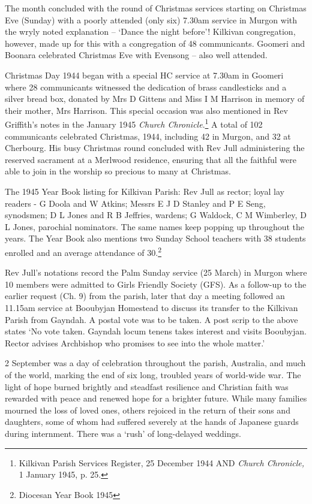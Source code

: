 The month concluded with the round of Christmas services starting on
Christmas Eve (Sunday) with a poorly attended (only six) 7.30am service
in Murgon with the wryly noted explanation -- `Dance the night before'!
Kilkivan congregation, however, made up for this with a congregation of
48 communicants. Goomeri and Boonara celebrated Christmas Eve with
Evensong -- also well attended.

Christmas Day 1944 began with a special HC service at 7.30am in Goomeri
where 28 communicants witnessed the dedication of brass candlesticks and
a silver bread box, donated by Mrs D Gittens and Miss I M Harrison in
memory of their mother, Mrs Harrison. This special occasion was also
mentioned in Rev Griffith's notes in the January 1945 \emph{Church
Chronicle}.\footnote{Kilkivan Parish Services Register, 25 December 1944
  AND \emph{Church Chronicle,} 1 January 1945, p. 25.} A total of 102
communicants celebrated Christmas, 1944, including 42 in Murgon, and 32
at Cherbourg. His busy Christmas round concluded with Rev Jull
administering the reserved sacrament at a Merlwood residence, ensuring
that all the faithful were able to join in the worship so precious to
many at Christmas.

The 1945 Year Book listing for Kilkivan Parish: Rev Jull as rector;
loyal lay readers - G Doola and W Atkins; Messrs E J D Stanley and P E
Seng, synodsmen; D L Jones and R B Jeffries, wardens; G Waldock, C M
Wimberley, D L Jones, parochial nominators. The same names keep popping
up throughout the years. The Year Book also mentions two Sunday School
teachers with 38 students enrolled and an average attendance of
30.\footnote{Diocesan Year Book 1945}

Rev Jull's notations record the Palm Sunday service (25 March) in Murgon
where 10 members were admitted to Girls Friendly Society (GFS). As a
follow-up to the earlier request (Ch. 9) from the parish, later that day
a meeting followed an 11.15am service at Booubyjan Homestead to discuss
its transfer to the Kilkivan Parish from Gayndah. A postal vote was to
be taken. A post scrip to the above states `No vote taken. Gayndah locum
tenens takes interest and visits Booubyjan. Rector advises Archbishop
who promises to see into the whole matter.'

2 September was a day of celebration throughout the parish, Australia,
and much of the world, marking the end of six long, troubled years of
world-wide war. The light of hope burned brightly and steadfast
resilience and Christian faith was rewarded with peace and renewed hope
for a brighter future. While many families mourned the loss of loved
ones, others rejoiced in the return of their sons and daughters, some of
whom had suffered severely at the hands of Japanese guards during
internment. There was a `rush' of long-delayed weddings.

